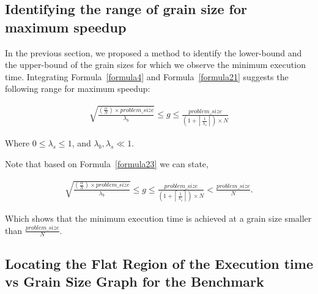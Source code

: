 \subsection{Identifying the range of grain size for maximum speedup}
In the previous section, we proposed a method to identify the lower-bound and the upper-bound of the grain sizes for which we observe the minimum execution time. 
Integrating Formula~\ref{formula4} and Formula~\ref{formula21} suggests the following range for maximum speedup:


\begin{equation}\label{formula23}
\begin{aligned}
{\sqrt{\frac{(\frac{\alpha}{N})\times{problem\_{size}}}{{\lambda_b}}}}\leq{g}\leq\frac{problem\_{size}}{(1+\left\lceil{\frac{1}{\lambda_s}}\right\rceil)\times{N}}
\end{aligned}
\end{equation}
 
Where $0\leq\lambda_s\leq1$, and $\lambda_b,\lambda_s\ll1$.

Note that based on Formula~\ref{formula23} we can state,

\begin{equation}\label{formula43}
\begin{aligned}
{\sqrt{\frac{(\frac{\alpha}{N})\times{problem\_{size}}}{{\lambda_b}}}}\leq{g}\leq\frac{problem\_{size}}{(1+\left\lceil{\frac{1}{\lambda_s}}\right\rceil)\times{N}}<\frac{problem\_{size}}{N}.
\end{aligned}
\end{equation}

Which shows that the minimum execution time is achieved at a grain size smaller than $\frac{problem\_{size}}{N}$.
 

\subsection{Locating the Flat Region of the Execution time vs Grain Size Graph for the Benchmark}

